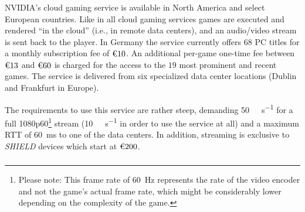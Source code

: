 



\subsubsection{\gfnow}

NVIDIA's cloud gaming service%
is available in North America and select European countries. Like in all
cloud gaming services  games are executed and rendered ``in the cloud''
(i.e., in remote data centers), and an audio/video stream is sent back
to the player. In Germany the service currently offers $68$ PC titles
for a monthly subscription fee of $\text{\texteuro} 10$. An additional
per-game one-time fee between $\text{\texteuro} 13$ and
$\text{\texteuro} 60$ is charged for the access to the $19$ most
prominent and recent games. The service is delivered from six
specialized data center locations (Dublin and Frankfurt in Europe).

The requirements to use this service are rather steep, demanding
\SI{50}{\mega\bit\per\second} for a full
1080p60\footnote{\label{foot:rate}Please note: This frame rate of
\SI{60}{\hertz} represents the rate of the video encoder and not the
game's actual frame rate, which might be considerably lower depending on
the complexity of the game.} stream (\SI{10}{\mega\bit\per\second} in
order to use the service at all) and a maximum \acrshort{RTT} of
\SI{60}{\milli\second} to one of the data centers. In addition,
streaming is exclusive to \textit{SHIELD} devices which start at
$\text{\texteuro} 200$.


\subsubsection{\psnow}

